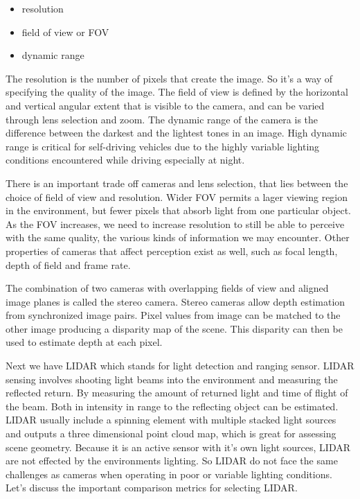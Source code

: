 \begin{itemize}
\item resolution
\item field of view or FOV
\item dynamic range
\end{itemize}

The resolution is the number of pixels that create the image. So it's a way of specifying
the quality of the image.  The field of view is defined by the horizontal and vertical angular extent that is visible to the camera, and can be
varied through lens selection and zoom. The dynamic range of the camera is the difference between the darkest and the lightest tones in an image. High dynamic range is critical for
self-driving vehicles due to the highly variable lighting conditions encountered
while driving especially at night. 

There is an important trade off cameras and lens selection, that lies between the choice of
field of view and resolution. Wider FOV permits a lager
viewing region in the environment, but fewer pixels that absorb light from one particular object. As the FOV increases, we need to increase resolution to still be
able to perceive with the same quality, the various kinds of information we may encounter. 
Other properties of cameras that affect perception exist as well, such as focal length, depth of field and frame rate. 
 
The combination of two cameras with overlapping fields of view and aligned image planes is
called the stereo camera. Stereo cameras allow depth estimation
from synchronized image pairs. Pixel values from image can be
matched to the other image producing a disparity map of the scene. This disparity can then be used
to estimate depth at each pixel. 


Next we have LIDAR which stands for light detection and ranging sensor. LIDAR sensing involves shooting
light beams into the environment and measuring the reflected return. By measuring the amount of returned
light and time of flight of the beam. Both in intensity in range to
the reflecting object can be estimated. LIDAR usually include a spinning element
with multiple stacked light sources and outputs a three dimensional
point cloud map, which is great for assessing scene geometry. Because it is an active sensor
with it's own light sources, LIDAR are not effected by
the environments lighting. So LIDAR do not face the same challenges
as cameras when operating in poor or variable lighting conditions. Let's discuss the important comparison
metrics for selecting LIDAR.

